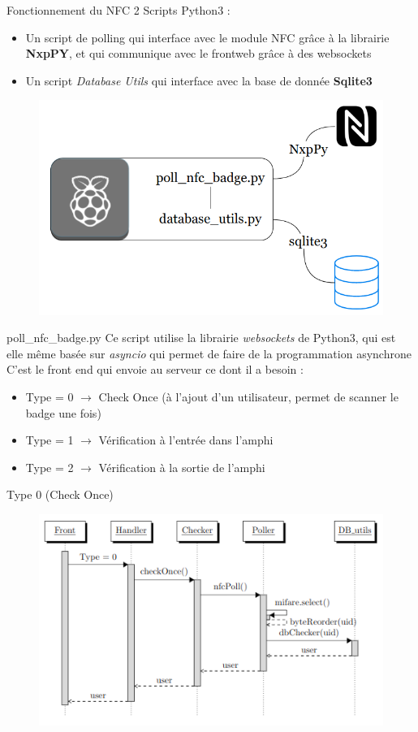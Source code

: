 \documentclass[aspectratio=169]{beamer}
\begin{document}
\begin{frame}{Fonctionnement du NFC}
  2 Scripts Python3 :
  \begin{itemize}
    \item Un script de polling qui interface avec le module NFC grâce à la librairie \textbf{NxpPY}, et qui communique avec le frontweb grâce à des websockets
    \item Un script \textit{Database Utils} qui interface avec la base de donnée \textbf{Sqlite3}
  \end{itemize}
  \begin{figure}
    \centering
    \includegraphics[width=.5\textwidth]{../assets/nfcarchitecture.png}
  \end{figure}
\end{frame}

\begin{frame}{poll\_nfc\_badge.py}
  Ce script utilise la librairie \textit{websockets} de Python3, qui est elle même basée sur \textit{asyncio} qui permet de faire de la programmation asynchrone
  C'est le front end qui envoie au serveur ce dont il a besoin :
  \begin{itemize}
    \item Type = 0 $\rightarrow$ Check Once (à l'ajout d'un utilisateur, permet de scanner le badge une fois)
    \item Type = 1 $\rightarrow$ Vérification à l'entrée dans l'amphi
    \item Type = 2 $\rightarrow$ Vérification à la sortie de l'amphi
  \end{itemize}

\end{frame}

\begin{frame}{Type 0 (Check Once)}
  \begin{figure}[]
    \includegraphics[height=\textheight]{../assets/nfcSeqOnce.png}
  \end{figure}

\end{frame}
\end{document}
